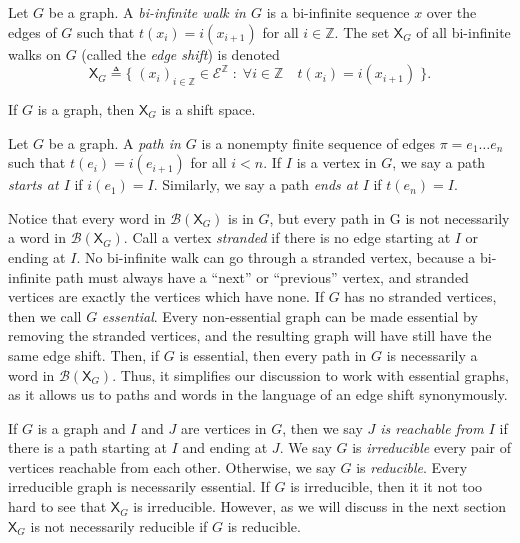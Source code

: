 \documentclass[hidelinks]{report}
\newcommand{\Ec}{\mathcal{E}}
\newcommand{\Bc}{\mathcal{B}}
\newcommand{\shift}[1]{\mathsf{X}_{#1}}
\newcommand{\term}[1]{\textit{#1}}
\theoremstyle{definition}
\begin{document}
\begin{definition}
    Let \(G\) be a graph. A \term{bi-infinite walk in \(G\)} is 
    a bi-infinite sequence \(x\) over the edges of \(G\) such that \(t(x_i) = i(x_{i+1})\)
    for all \(i \in \mathbb{Z}\).
    The set \(\shift{G}\) of all bi-infinite 
    walks on \(G\) (called the \term{edge shift}) is denoted
    \[\shift{G} \triangleq \big\{ \; (x_i)_{i \in \mathbb{Z}} \in \Ec^\mathbb{Z} \; : \; \forall i \in \mathbb{Z} \quad t(x_i) = i(x_{i+1}) \; \big\}. \]
\end{definition}

\begin{theorem}[name=\cite{lind1995introduction}]
    If \(G\) is a graph, then \(\shift{G}\) is a shift space.
\end{theorem}

Let \(G\) be a graph. A \term{path in \(G\)} is a nonempty finite sequence of edges \(\pi = e_1 \dots e_n\) such that \(t(e_i) = i(e_{i+1})\) for all \(i < n\).
If \(I\) is a vertex in \(G\), we say a path \term{starts at \(I\)} if \(i(e_1) = I\). Similarly, 
we say a path \term{ends at \(I\)} if \(t(e_n) = I\).

Notice that every word in \(\Bc(\shift{G})\) is in \(G\), but every path in G is 
not necessarily a word in \(\Bc(\shift{G})\). Call a vertex \term{stranded} if 
there is no edge starting at \(I\) or  ending at \(I\). No bi-infinite walk can go 
through a stranded vertex, because a bi-infinite path must always have a ``next''
or ``previous'' vertex, and stranded vertices are exactly the vertices which have none.
If \(G\) has no stranded vertices, then we call \(G\) \term{essential}. Every 
non-essential graph can be made essential by removing the stranded vertices, and 
the resulting graph will have still have the same edge shift. Then, if \(G\) 
is essential, then every path in \(G\) is necessarily a word in \(\Bc(\shift{G})\). 
Thus, it simplifies our discussion to work with essential graphs, as 
it allows us to paths and words in the language of an edge shift synonymously. 

If \(G\) is a graph and \(I\) and \(J\)
are vertices in \(G\), then we say \term{\(J\) is reachable from \(I\)}
if there is a path starting at \(I\) and ending at \(J\). We say \(G\) is \term{irreducible}
every pair of vertices reachable from each other. Otherwise, we say \(G\) is \term{reducible}. 
Every irreducible graph is necessarily essential. If \(G\) is irreducible, then 
it it not too hard to see that \(\shift{G}\) is irreducible. However, 
as we will discuss in the next section \(\shift{G}\) is not necessarily reducible 
if \(G\) is reducible.
\end{document}
